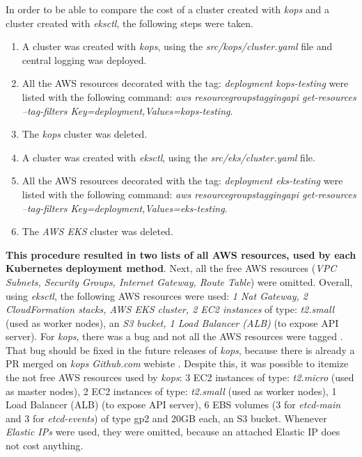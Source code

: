 In order to be able to compare the cost of a cluster created with \textit{kops} and a cluster created with \textit{eksctl}, the following steps were taken.
\begin{enumerate}
\item A cluster was created with \textit{kops}, using the \textit{src/kops/cluster.yaml} file and central logging was deployed.
\item All the AWS resources decorated with the tag: \textit{deployment kops-testing} were listed with the following command: \textit{aws resourcegroupstaggingapi get-resources --tag-filters Key=deployment,Values=kops-testing}.
\item The \textit{kops} cluster was deleted.
\item A cluster was created with \textit{eksctl}, using the \textit{src/eks/cluster.yaml} file.
\item All the AWS resources decorated with the tag: \textit{deployment eks-testing} were listed with the following command: \textit{aws resourcegroupstaggingapi get-resources --tag-filters Key=deployment,Values=eks-testing}.
\item The \textit{AWS EKS} cluster was deleted.
\end{enumerate}

\textbf{This procedure resulted in two lists of all AWS resources, used by each Kubernetes deployment method}. Next, all the free AWS resources (\textit{VPC Subnets, Security Groups, Internet Gateway, Route Table}) were omitted. Overall, using \textit{eksctl}, the following AWS resources were used: \textit{1 Nat Gateway, 2 CloudFormation stacks, AWS EKS cluster, 2 EC2 instances} of type: \textit{t2.small} (used as worker nodes), an \textit{S3 bucket, 1 Load Balancer (ALB)} (to expose API server). For \textit{kops}, there was a bug and not all the AWS resources were tagged \cite{kops-issue-tags}. That bug should be fixed in the future releases of \textit{kops}, because there is already a PR merged on \textit{kops} \textit{Github.com} webiste \cite{kops-issue-tags-pr}. Despite this, it was possible to itemize the not free AWS resources used by \textit{kops}: 3 EC2 instances of type: \textit{t2.micro} (used as master nodes), 2 EC2 instances of type: \textit{t2.small} (used as worker nodes), 1 Load Balancer (ALB) (to expose API server), 6 EBS volumes (3 for \textit{etcd-main} and 3 for \textit{etcd-events}) of type gp2 and 20GB each, an S3 bucket. Whenever \textit{Elastic IPs} were used, they were omitted, because an attached Elastic IP does not cost anything.

